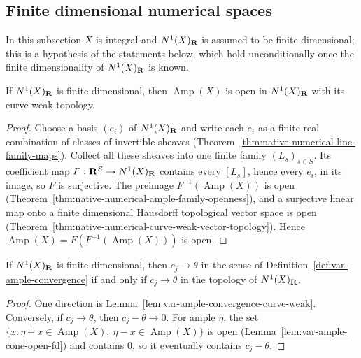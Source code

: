 \subsection{Finite dimensional numerical spaces}

In this subsection $X$ is integral and $N^1(X)_{\mathbf{R}}$ is assumed to be finite dimensional; this is
a hypothesis of the statements below, which hold unconditionally once the finite dimensionality
of $N^1(X)_{\mathbf{R}}$ is known.

\begin{lemma}
\label{lem:var-ample-cone-open-fd}
\leanok
{}
If $N^1(X)_{\mathbf{R}}$ is finite dimensional, then $\operatorname{Amp}(X)$ is open in $N^1(X)_{\mathbf{R}}$ with
its curve-weak topology.
\end{lemma}
\begin{proof}
Choose a basis $(e_i)$ of $N^1(X)_{\mathbf{R}}$ and write each $e_i$ as a finite real combination of
classes of invertible sheaves (Theorem~\ref{thm:native-numerical-line-family-maps}). Collect
all these sheaves into one finite family $(L_s)_{s\in S}$. Its coefficient map
$F:\mathbf{R}^S\to N^1(X)_{\mathbf{R}}$ contains every $[L_s]$, hence every $e_i$, in its image, so $F$ is
surjective. The preimage $F^{-1}(\operatorname{Amp}(X))$ is open
(Theorem~\ref{thm:native-numerical-ample-family-openness}), and a surjective linear map onto a
finite dimensional Hausdorff topological vector space is open
(Theorem~\ref{thm:native-numerical-curve-weak-vector-topology}). Hence
$\operatorname{Amp}(X)=F(F^{-1}(\operatorname{Amp}(X)))$ is open.
\end{proof}

\begin{theorem}
\label{thm:var-ample-convergence-fd}
\leanok
{}
If $N^1(X)_{\mathbf{R}}$ is finite dimensional, then $c_j\to\theta$ in the sense of
Definition~\ref{def:var-ample-convergence} if and only if $c_j\to\theta$ in the topology of
$N^1(X)_{\mathbf{R}}$.
\end{theorem}
\begin{proof}
One direction is Lemma~\ref{lem:var-ample-convergence-curve-weak}. Conversely, if
$c_j\to\theta$, then $c_j-\theta\to0$. For ample $\eta$, the set
$\{x:\eta+x\in\operatorname{Amp}(X),\ \eta-x\in\operatorname{Amp}(X)\}$ is open
(Lemma~\ref{lem:var-ample-cone-open-fd}) and contains $0$, so it eventually contains
$c_j-\theta$.
\end{proof}

